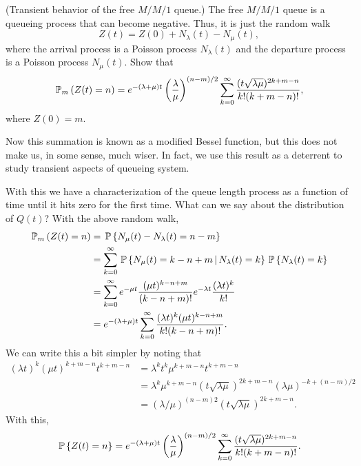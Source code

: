 \begin{question} (Transient behavior of the free $M/M/1$ queue.)  The
  free $M/M/1$ queue is a queueing process that can become
  negative. Thus, it is just the random walk
\begin{equation*}
  Z(t) = Z(0) + N_\lambda(t) - N_\mu(t), 
\end{equation*}
where the arrival process is a Poisson process $N_\lambda(t)$ and the
departure process is a Poisson process $N_\mu(t)$. Show that
\begin{equation*}
    \PP{m}{Z(t)=n} 
= e^{-(\lambda+\mu)t} \left(\frac\lambda\mu\right)^{(n-m)/2} \sum_{k=0}^\infty 
\frac{(t\sqrt{\lambda\mu} )^{2k+m-n}}{k!(k+m-n)!},
\end{equation*}
where $Z(0)=m$. 


Now this summation is known as a modified Bessel function, but this
does not make us, in some sense, much wiser. In fact, we use this
result as a deterrent to study transient aspects of queueing system.



\begin{solution}
With this we have a characterization of the queue length process as a
function of time until it hits zero for the first time. What can we
say about the distribution of $Q(t)$? With the above random walk, 
\begin{equation*}
  \begin{split}
    \PP{m}{Z(t)=n} 
&= \P{N_\mu(t) - N_\lambda(t) = n - m }  \\
&= \sum_{k=0}^\infty \P{N_\mu(t) = k - n + m\given N_\lambda(t) = k } \P{N_\lambda(t)=k}\\
&= \sum_{k=0}^\infty e^{-\mu t} \frac{(\mu t)^{k -n+m}}{(k-n +m)!} e^{-\lambda t} \frac{(\lambda t)^k}{k!} \\
&= e^{-(\lambda+\mu)t} \sum_{k=0}^\infty \frac{(\lambda t)^k(\mu t)^{k  -n + m }}{k!(k-n+m)!}.
  \end{split}
\end{equation*}
We can write this a bit simpler by noting that
\begin{equation*}
  \begin{split}
  (\lambda t)^k (\mu t) ^{k + m - n} t^{k+m-n} 
&=  \lambda^k t^k\mu^{k + m - n} t^{k+m-n} \\
&= \lambda^k \mu^{k + m - n} (t\sqrt{\lambda \mu})^{2k+m-n} (\lambda\mu)^{-k + (n-m)/2} \\
&= (\lambda/\mu)^{(n-m)2} (t\sqrt{\lambda \mu})^{2k+m-n}.
  \end{split}
\end{equation*}
With this,
\begin{equation*}
    \P{Z(t)=n} 
= e^{-(\lambda+\mu)t} \left(\frac\lambda\mu\right)^{(n-m)/2} \sum_{k=0}^\infty 
\frac{(t\sqrt{\lambda\mu} )^{2k+m-n}}{k!(k+m-n)!}.
\end{equation*}
  

\end{solution}
\end{question}
